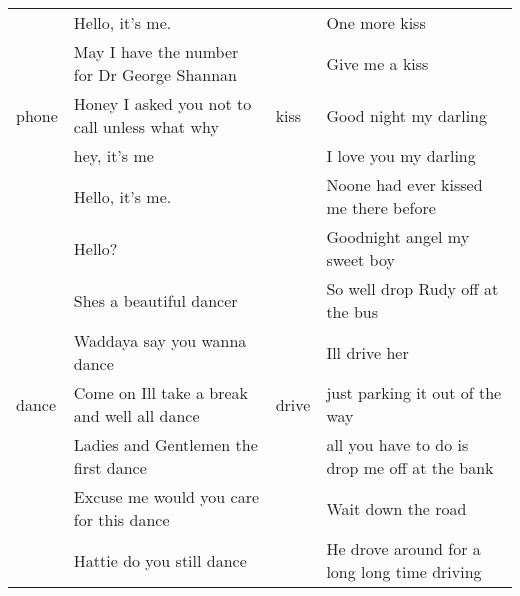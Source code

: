 \begin{scriptsize}
\begin{tabular}{l l l l} 
\toprule
 \cellcolor{salmon}&   \cellcolor{salmon}Hello, it's me. & \cellcolor{mistyrose}&    \cellcolor{mistyrose}  One more kiss      \\ 
 \cellcolor{salmon}&   \cellcolor{salmon}May I have the number for Dr George Shannan & \cellcolor{mistyrose}&  \cellcolor{mistyrose}    Give me a kiss     \\
\cellcolor{salmon}phone &   \cellcolor{salmon}Honey I asked you not to call unless what why &  \cellcolor{mistyrose} kiss &    \cellcolor{mistyrose}  Good night my darling      \\
\cellcolor{salmon} &   \cellcolor{salmon}hey, it's me & \cellcolor{mistyrose}&     \cellcolor{mistyrose}   I love you my darling       \\
 \cellcolor{salmon}&   \cellcolor{salmon}Hello, it's me. & \cellcolor{mistyrose}&  \cellcolor{mistyrose}  Noone had ever kissed me there before       \\
 \cellcolor{salmon} &   \cellcolor{salmon}Hello? & \cellcolor{mistyrose}&    \cellcolor{mistyrose} Goodnight angel my sweet boy     \\

\cellcolor{lavenderblue} &   \cellcolor{lavenderblue}Shes a beautiful dancer & \cellcolor{azure}&     \cellcolor{azure} So well drop Rudy off at the  bus  \\ 
\cellcolor{lavenderblue} &\cellcolor{lavenderblue}Waddaya say you wanna dance & \cellcolor{azure}&    \cellcolor{azure}  Ill drive her            \\
\cellcolor{lavenderblue}dance &   \cellcolor{lavenderblue}Come on Ill take a break and well all dance & \cellcolor{azure} drive & \cellcolor{azure} just parking it out of the way     \\
\cellcolor{lavenderblue} &\cellcolor{lavenderblue}Ladies and Gentlemen the first dance &\cellcolor{azure}&    \cellcolor{azure}   all you have to do is drop  me off at the bank    \\
\cellcolor{lavenderblue}&\cellcolor{lavenderblue}Excuse me would you care for this  dance &\cellcolor{azure}& \cellcolor{azure}Wait down the road         \\
 \cellcolor{lavenderblue} & \cellcolor{lavenderblue}Hattie do you still dance &\cellcolor{azure}&\cellcolor{azure} He drove around for a long long time driving                \\
\bottomrule
\end{tabular}
\end{scriptsize}
